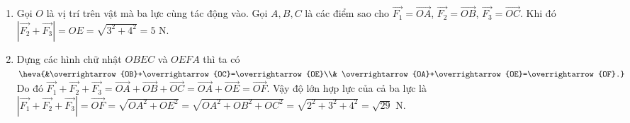 \begin{bt}
{\begin{center}
\begin{tikzpicture}[line join=round,line cap=round,font=\footnotesize,scale=1,>=stealth]
				\end{tikzpicture}
		\end{center}
		\begin{enumerate}
			\item Gọi $O$ là vị trí trên vật mà ba lực cùng tác động vào. Gọi $A, B, C$ là các điểm  sao cho $\overrightarrow{F_1}=\overrightarrow{OA}$, $\overrightarrow{F_2}=\overrightarrow{OB}$, $\overrightarrow{F_3}=\overrightarrow{OC}$. Khi đó $\left|\overrightarrow{F_2}+\overrightarrow{F_3}\right|=OE=\sqrt{3^2+4^2}=5\text{ N}$.
			\item Dựng các hình chữ nhật $OBEC$ và $OEFA$ thì ta  có
			$\heva{&\overrightarrow{OB}+\overrightarrow{OC}=\overrightarrow{OE}\\& 
			 \overrightarrow{OA}+\overrightarrow{OE}=\overrightarrow{OF}.}$\\
			 Do đó $\overrightarrow{F_1}+\overrightarrow{F_2}+\overrightarrow{F_3}=\overrightarrow{OA}+\overrightarrow{OB}+\overrightarrow{OC}=\overrightarrow{OA}+\overrightarrow{OE}=\overrightarrow{OF}$.
			Vậy độ lớn  hợp lực của cả ba lực là
			$\left|\overrightarrow{F_1}+\overrightarrow{F_2}+\overrightarrow{F_3}\right|=\overrightarrow{OF}=\sqrt{OA^2+OE^2}=\sqrt{OA^2+OB^2+OC^2}=\sqrt{2^2+3^2+4^2}=\sqrt{29}\text{ N}$. 
		\end{enumerate}
	} 
\end{bt}

